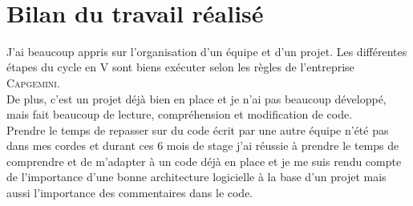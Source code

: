 \begin{minipage}{\linewidth}%
\label{visina8}%
\end{minipage}\\
\section{Bilan du travail réalisé}

J'ai beaucoup appris sur l'organisation d'un équipe et d'un projet. Les différentes étapes du cycle en V sont biens exécuter selon les règles de l'entreprise \textsc{Capgemini}.
\\De plus, c'est un projet déjà bien en place et je n'ai pas beaucoup développé, mais fait beaucoup de lecture, compréhension et modification de code.
\\Prendre le temps de repasser sur du code écrit par une autre équipe n'été pas dans mes cordes et durant ces 6 mois de stage j'ai réussie à prendre le temps de comprendre et de m'adapter à un code déjà en place et je me suis rendu compte de
 l'importance d'une bonne architecture logicielle à la base d'un projet mais aussi l'importance des commentaires dans le code. 
